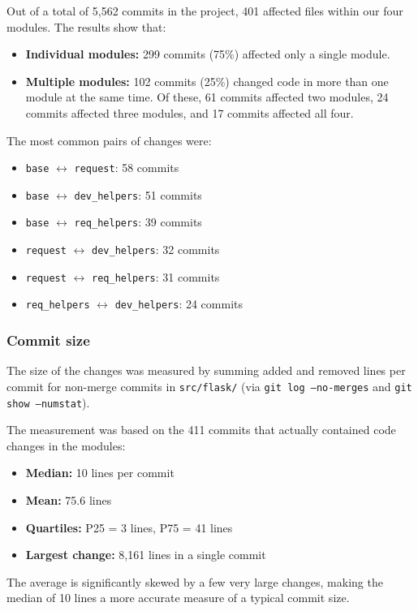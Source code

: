 \documentclass[12pt,a4paper]{article}
\begin{document}
Out of a total of 5,562 commits in the project, 401 affected files within our four modules. The results show that:
\begin{itemize}
    \item \textbf{Individual modules:} 299 commits (75\%) affected only a single module.
    \item \textbf{Multiple modules:} 102 commits (25\%) changed code in more than one module at the same time. Of these, 61 commits affected two modules, 24 commits affected three modules, and 17 commits affected all four.
\end{itemize}

The most common pairs of changes were:
\begin{itemize}
    \item \texttt{base} $\leftrightarrow$ \texttt{request}: 58 commits
    \item \texttt{base} $\leftrightarrow$ \texttt{dev\_helpers}: 51 commits
    \item \texttt{base} $\leftrightarrow$ \texttt{req\_helpers}: 39 commits
    \item \texttt{request} $\leftrightarrow$ \texttt{dev\_helpers}: 32 commits
    \item \texttt{request} $\leftrightarrow$ \texttt{req\_helpers}: 31 commits
    \item \texttt{req\_helpers} $\leftrightarrow$ \texttt{dev\_helpers}: 24 commits
\end{itemize}

\subsubsection{Commit size}
The size of the changes was measured by summing added and removed lines per commit for non-merge commits in \texttt{src/flask/} (via \texttt{git log --no-merges} and \texttt{git show --numstat}).

The measurement was based on the 411 commits that actually contained code changes in the modules:
\begin{itemize}
    \item \textbf{Median:} 10 lines per commit
    \item \textbf{Mean:} 75.6 lines
    \item \textbf{Quartiles:} P25 = 3 lines, P75 = 41 lines
    \item \textbf{Largest change:} 8,161 lines in a single commit
\end{itemize}
The average is significantly skewed by a few very large changes, making the median of 10 lines a more accurate measure of a typical commit size.
\end{document}

